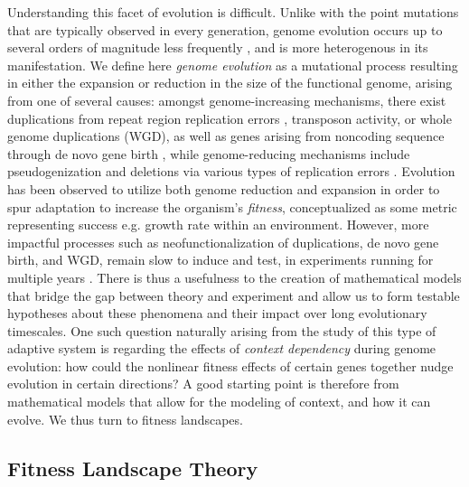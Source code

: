 \documentclass[paper=a4, fontsize=11pt,twoside]{scrartcl}       %
\begin{document}
Understanding this facet of evolution is difficult. Unlike with the point mutations that are typically observed in every generation, genome evolution occurs up to several orders of magnitude less frequently \cite{sousaRatesTranspositionEscherichia2013}\cite{lipinskiHighSpontaneousRate2011}, and is more heterogenous in its manifestation. We define here \textit{genome evolution} as a mutational process resulting in either the expansion or reduction in the size of the functional genome, arising from one of several causes: amongst genome-increasing mechanisms, there exist duplications from repeat region replication errors \cite{reamsMechanismsGeneDuplication2015}, transposon activity, or whole genome duplications (WGD), as well as genes arising from noncoding sequence through de novo gene birth \cite{sacconeOriginEvolutionGenes2025}, while genome-reducing mechanisms include pseudogenization and deletions via various types of replication errors \cite{burssedMechanismsStructuralChromosomal2022}. Evolution has been observed to utilize both genome reduction \cite{helsenGeneLossPredictably2020}\cite{szameczGenomicLandscapeCompensatory2014} and expansion \cite{vossebergTimingOriginEukaryotic2021} in order to spur adaptation to increase the organism's \textit{fitness}, conceptualized as some metric representing success e.g. growth rate within an environment. However, more impactful processes such as neofunctionalization of duplications, de novo gene birth, and WGD, remain slow to induce and test, in experiments running for multiple years \cite{tongGenomeDuplicationLongterm2025}. There is thus a usefulness to the creation of mathematical models that bridge the gap between theory and experiment and allow us to form testable hypotheses about these phenomena and their impact over long evolutionary timescales. One such question naturally arising from the study of this type of adaptive system is regarding the effects of \textit{context dependency} during genome evolution: how could the nonlinear fitness effects of certain genes together nudge evolution in certain directions? A good starting point is therefore from mathematical models that allow for the modeling of context, and how it can evolve. We thus turn to fitness landscapes.

\subsection*{Fitness Landscape Theory}
\end{document}
